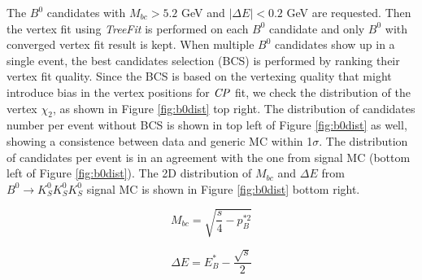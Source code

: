  The $B^0$ candidates with $M_{bc} > 5.2$ GeV and $|\Delta{E}| < 0.2$ GeV are requested. Then the vertex fit using \textit{TreeFit} is performed on each $B^0$ candidate and only $B^0$ with converged vertex fit result is kept. When multiple $B^0$ candidates show up in a single event, the best candidates selection (BCS) is performed by ranking their vertex fit quality. Since the BCS is based on the vertexing quality that might introduce bias in the vertex positions for $\it{CP}$ fit, we check the distribution of the vertex $\chi_2$, as shown in Figure \ref{fig:b0dist} top right. The distribution of candidates number per event without BCS is shown in top left of Figure \ref{fig:b0dist} as well, showing a consistence between data and generic MC within 1$\sigma$. The distribution of candidates per event is in an agreement with the one from signal MC (bottom left of Figure \ref{fig:b0dist}). The 2D distribution of $M_{bc}$ and $\Delta E$ from $B^0 \to K_S^0  K_S^0  K_S^0$ signal MC is shown in Figure \ref{fig:b0dist}  bottom right.
 
 \begin{equation}\label{eq:mbc}
 M_{bc} = \sqrt{\frac{s}{4}-p^{*2}_B} 
 \end{equation}
 
 \begin{equation}\label{eq:dE}
 \Delta E = E^*_B - \frac{\sqrt{s}}{2}
 \end{equation}
 
